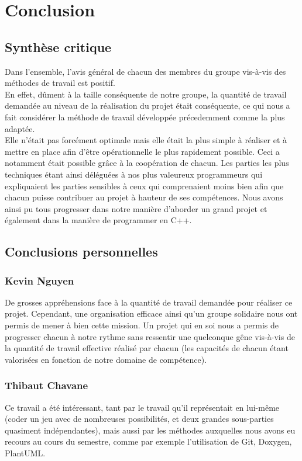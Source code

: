 \chapter{Conclusion}
    \section{Synthèse critique}
        Dans l'ensemble, l'avis général de chacun des membres du groupe vis-à-vis des méthodes de travail est positif.\\

        En effet, dûment à la taille conséquente de notre groupe, la quantité de travail demandée au niveau de la réalisation du projet était conséquente, ce qui nous a fait considérer la méthode de travail développée précedemment comme la plus adaptée.\\

        Elle n'était pas forcément optimale mais elle était la plus simple à réaliser et à mettre en place afin d'être opérationnelle le plus rapidement possible. Ceci a notamment était possible grâce à la coopération de chacun. Les parties les plus techniques étant ainsi déléguées à nos plus valeureux programmeurs qui expliquaient les parties sensibles à ceux qui comprenaient moins bien afin que chacun puisse contribuer au projet à hauteur de ses compétences. Nous avons ainsi pu tous progresser dans notre manière d'aborder un grand projet et également dans la manière de programmer en C++.
    \section{Conclusions personnelles}
        \subsection{Kevin Nguyen}
            De grosses appréhensions face à la quantité de travail demandée pour réaliser ce projet. Cependant, une organisation efficace ainsi qu'un groupe solidaire nous ont permis de mener à bien cette mission. Un projet qui en soi nous a permis de progresser chacun à notre rythme sans ressentir une quelconque gêne vis-à-vis de la quantité de travail effective réalisé par chacun (les capacités de chacun étant valorisées en fonction de notre domaine de compétence).
        \subsection{Thibaut Chavane}
            Ce travail a été intéressant, tant par le travail qu'il représentait en lui-même (coder un jeu avec de nombreuses possibilités, et deux grandes sous-parties quasiment indépendantes), mais aussi par les méthodes auxquelles nous avons eu recours au cours du semestre, comme par exemple l'utilisation de Git, Doxygen, PlantUML. \\

